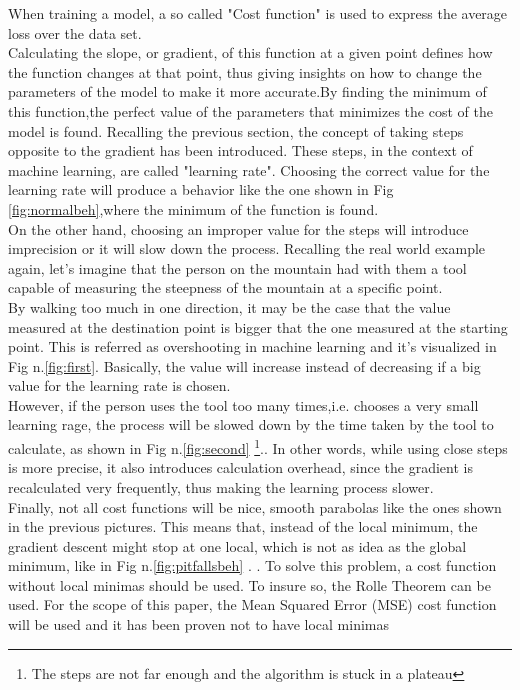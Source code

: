 \documentclass[conference]{IEEEtran}
\begin{document}
When training a model, a so called "Cost function" is used to express the average loss over the data set.\\
Calculating the slope, or gradient, of this function at a given point defines how the function changes at that point, thus giving insights on how to change the parameters of the model to make it more accurate.By finding the minimum of this function,the perfect value of the parameters that minimizes the cost of the model is found. 
Recalling the previous section, the concept of taking steps opposite to the gradient has been introduced. These steps, in the context of machine learning, are called "learning rate".
Choosing the correct value for the learning rate will produce a behavior like the one shown in Fig \ref{fig:normalbeh},where the minimum of the function is found. \\
On the other hand, choosing an improper value for the steps will introduce imprecision or it will slow down the process.
Recalling the real world example again, let's imagine that the person on the mountain had with them a tool capable of measuring the steepness of the mountain at a specific point. \\
By walking too much in one direction, it may be the case that the value measured at the destination point is bigger that the one measured at the starting point. This is referred as overshooting in machine learning and it's visualized in Fig n.\ref{fig:first}. Basically, the value will increase instead of decreasing if a big value for the learning rate is chosen.\\
However, if the person uses the tool too many times,i.e. chooses a very small learning rage, the process will be slowed down by the time taken by the tool to calculate, as shown in Fig n.\ref{fig:second} \footnote{ The steps are not far enough and the algorithm is stuck in a plateau}.. In other words, while using close steps is more precise, it also introduces calculation overhead, since the gradient is recalculated very frequently, thus making the learning process slower. \cite{Scikit-Learn}\\
Finally, not all cost functions will be nice, smooth parabolas like the ones shown in the previous pictures. This means that, instead of the local minimum, the gradient descent might stop at one local, which is not as idea as the global minimum, like in Fig n.\ref{fig:pitfallsbeh} .\cite{Scikit-Learn} . 
To solve this problem, a cost function without local minimas should be used. To insure so, the Rolle Theorem can be used\cite{Roll}. For the scope of this paper, the Mean Squared Error (MSE) cost function will be used and it has been proven not to have local minimas
\end{document}
